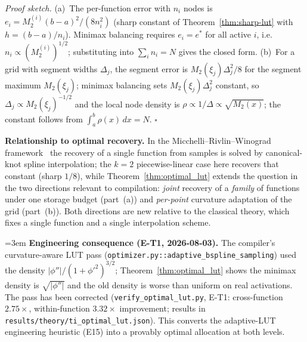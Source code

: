 \vspace{2pt}
\noindent\textit{Proof sketch.}
(a)~The per-function error with $n_i$ nodes is
$e_i = M_2^{(i)}(b-a)^2/(8 n_i^2)$ (sharp constant of
Theorem~\ref{thm:sharp-lut} with $h = (b-a)/n_i$). Minimax balancing
requires $e_i = e^{*}$ for all active $i$, i.e.
$n_i \propto (M_2^{(i)})^{1/2}$; substituting into $\sum_i n_i = N$
gives the closed form. (b)~For a grid with segment widths
$\Delta_j$, the segment error is $M_2(\xi_j)\Delta_j^2/8$ for the
segment maximum $M_2(\xi_j)$; minimax balancing sets
$M_2(\xi_j)\Delta_j^2$ constant, so $\Delta_j \propto
M_2(\xi_j)^{-1/2}$ and the local node density is
$\rho \propto 1/\Delta \propto \sqrt{M_2(x)}$; the constant follows
from $\int_a^b \rho(x)\,dx = N$. $\square$

\vspace{2pt}
\noindent\textbf{Relationship to optimal recovery.} In the
Micchelli--Rivlin--Winograd framework~\cite{micchelli1977survey} the
recovery of a single function from samples is solved by canonical-knot
spline interpolation; the $k=2$ piecewise-linear case here recovers that
constant (sharp $1/8$), while Theorem~\ref{thm:optimal_lut} extends the
question in the two directions relevant to compilation: \emph{joint}
recovery of a \emph{family} of functions under one storage budget
(part~(a)) and \emph{per-point} curvature adaptation of the grid
(part~(b)). Both directions are new relative to the classical theory,
which fixes a single function and a single interpolation scheme.

\vspace{2pt}
\begingroup{}\emergencystretch=3em
\noindent\textbf{Engineering consequence (E-T1, 2026-08-03).}
The compiler's curvature-aware LUT pass
(\texttt{optimizer.py::\allowbreak{}adaptive\_bspline\_sampling}) used the density
$|\phi''|/(1+\phi'^2)^{3/2}$; Theorem~\ref{thm:optimal_lut} shows the
minimax density is $\sqrt{|\phi''|}$ and the old density is worse than
uniform on real activations. The pass has been corrected
(\texttt{verify\_optimal\_\allowbreak{}lut.py}, E-T1: cross-function $2.75\times$,
within-function $3.32\times$ improvement; results in
\texttt{results/theory/\allowbreak{}ti\_optimal\_lut.json}). This converts the
adaptive-LUT engineering heuristic (E15) into a provably optimal
allocation at both levels.\par\endgroup
